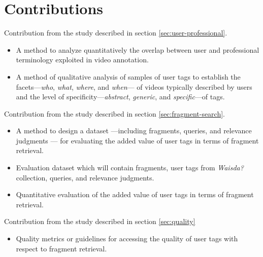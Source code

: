 \section{Contributions}
Contribution from the study described in section \ref{sec:user-professional}.
\begin{itemize}
\item A method to analyze quantitatively the overlap between user and professional terminology exploited in video annotation.
\item A method of qualitative analysis of samples of user tags to establish the facets---\textit{who}, \textit{what}, \textit{where}, and \textit{when}--- of videos typically described by users and the level of specificity---\textit{abstract}, \textit{generic}, and \textit{specific}---of tags.
\end{itemize}
Contribution from the study described in section \ref{sec:fragment-search}.
\begin{itemize}
\item A method to design a dataset ---including fragments, queries, and relevance judgments --- for evaluating the added value of user tags in terms of fragment retrieval.
\item Evaluation dataset which will contain fragments, user tags from \textit{Waisda?} collection, queries, and relevance judgments.
\item Quantitative evaluation of the added value of user tags in terms of fragment retrieval.
\end{itemize}
Contribution from the study described in section \ref{sec:quality}
\begin{itemize}
\item Quality metrics or guidelines for accessing the quality of user tags with respect to fragment retrieval.
\end{itemize}

